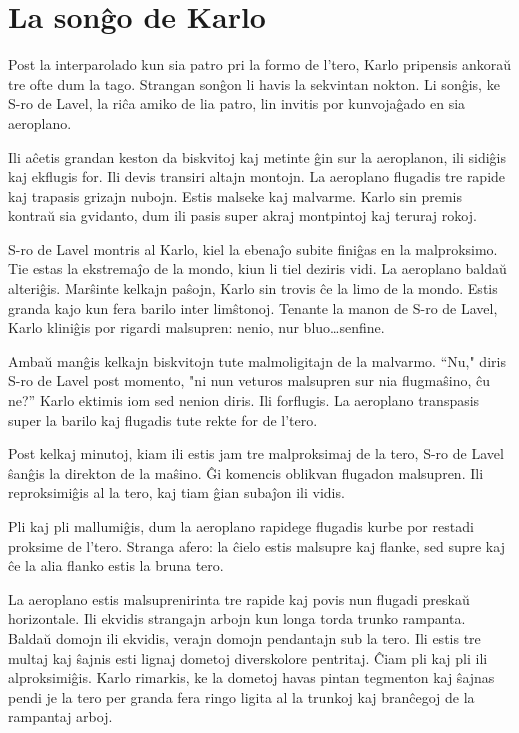 \chapter{La sonĝo de Karlo}

Post la interparolado kun sia patro pri la formo de l'tero, Karlo pripensis ankoraŭ tre ofte dum la tago. Strangan sonĝon li havis la sekvintan nokton. Li sonĝis, ke S-ro de Lavel, la riĉa amiko de lia patro, lin invitis por kunvojaĝado en sia aeroplano.

Ili aĉetis grandan keston da biskvitoj kaj metinte ĝin sur la aeroplanon, ili sidiĝis kaj ekflugis for. Ili devis transiri altajn montojn. La aeroplano flugadis tre rapide kaj trapasis grizajn nubojn. Estis malseke kaj malvarme. Karlo sin premis kontraŭ sia gvidanto, dum ili pasis super akraj montpintoj kaj teruraj rokoj.

S-ro de Lavel montris al Karlo, kiel la ebenaĵo subite finiĝas en la malproksimo. Tie estas la ekstremaĵo de la mondo, kiun li tiel deziris vidi. La aeroplano baldaŭ alteriĝis. Marŝinte kelkajn paŝojn, Karlo sin trovis ĉe la limo de la mondo. Estis granda kajo kun fera barilo inter limŝtonoj. Tenante la manon de S-ro de Lavel, Karlo kliniĝis por rigardi malsupren: nenio, nur bluo\ldots{}senfine.

Ambaŭ manĝis kelkajn biskvitojn tute malmoligitajn de la malvarmo. ``Nu," diris S-ro de Lavel post momento, "ni nun veturos malsupren sur nia flugmaŝino, ĉu ne?'' Karlo ektimis iom sed nenion diris. Ili forflugis. La aeroplano transpasis super la barilo kaj flugadis tute rekte for de l'tero.

Post kelkaj minutoj, kiam ili estis jam tre malproksimaj de la tero, S-ro de Lavel ŝanĝis la direkton de la maŝino. Ĝi komencis oblikvan flugadon malsupren. Ili reproksimiĝis al la tero, kaj tiam ĝian subaĵon ili vidis.

Pli kaj pli mallumiĝis, dum la aeroplano rapidege flugadis kurbe por restadi proksime de l'tero. Stranga afero: la ĉielo estis malsupre kaj flanke, sed supre kaj ĉe la alia flanko estis la bruna tero.

La aeroplano estis malsuprenirinta tre rapide kaj povis nun flugadi preskaŭ horizontale. Ili ekvidis strangajn arbojn kun longa torda trunko rampanta. Baldaŭ domojn ili ekvidis, verajn domojn pendantajn sub la tero. Ili estis tre multaj kaj ŝajnis esti lignaj dometoj diverskolore pentritaj. Ĉiam pli kaj pli ili alproksimiĝis. Karlo rimarkis, ke la dometoj havas pintan tegmenton kaj ŝajnas pendi je la tero per granda fera ringo ligita al la trunkoj kaj branĉegoj de la rampantaj arboj.

